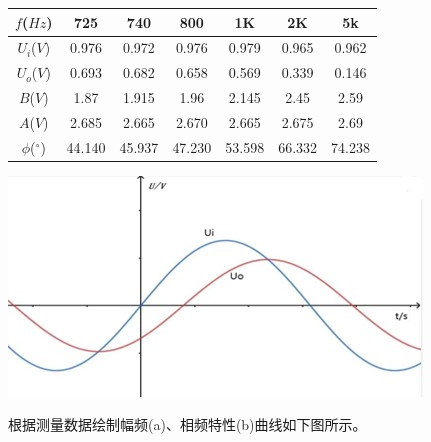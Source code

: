 \documentclass[a4paper]{article}
\begin{document}
    \begin{tabular}{|c|c|c|c|c|c|c|}
        \hline
        $f$($Hz$)        & 725    & 740    & 800    & 1K     & 2K     & 5k     \\
        \hline
        $U_{i}$($V$)       & 0.976  & 0.972  & 0.976  & 0.979  & 0.965  & 0.962  \\
        \hline
        $U_{o}$($V$)       & 0.693  & 0.682  & 0.658  & 0.569  & 0.339  & 0.146  \\
        \hline
        $B$($V$)           & 1.87   & 1.915  & 1.96   & 2.145  & 2.45   & 2.59   \\
        \hline
        $A$($V$)           & 2.685  & 2.665  & 2.670  & 2.665  & 2.675  & 2.69   \\
        \hline
        $\phi$($^{\circ}$) & 44.140 & 45.937 & 47.230 & 53.598 & 66.332 & 74.238 \\
        \hline
    \end{tabular}

    \vspace{0.3cm}


    \includegraphics[height=0.18\textheight]{7}

    \hspace{2.5cm}{\small 图6}

    {根据测量数据绘制幅频(a)、相频特性(b)曲线如下图所示。}
\end{document}
